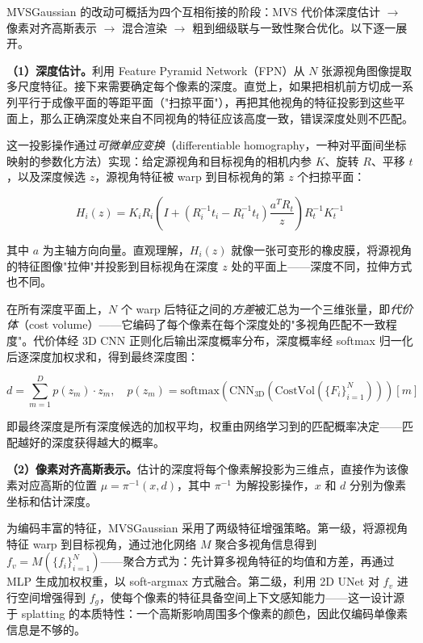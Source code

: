 MVSGaussian 的改动可概括为四个互相衔接的阶段：MVS 代价体深度估计 $\to$ 像素对齐高斯表示 $\to$ 混合渲染 $\to$ 粗到细级联与一致性聚合优化。以下逐一展开。

\textbf{（1）深度估计。}利用 Feature Pyramid Network（FPN）从 $N$ 张源视角图像提取多尺度特征。接下来需要确定每个像素的深度。直觉上，如果把相机前方切成一系列平行于成像平面的等距平面（"扫掠平面"），再把其他视角的特征投影到这些平面上，那么正确深度处来自不同视角的特征应该高度一致，错误深度处则不匹配。

这一投影操作通过\emph{可微单应变换}（differentiable homography，一种对平面间坐标映射的参数化方法）实现：给定源视角和目标视角的相机内参 $K$、旋转 $R$、平移 $t$，以及深度候选 $z$，源视角特征被 warp 到目标视角的第 $z$ 个扫掠平面：

\begin{equation}
H_i(z) = K_i R_i \left(I + (R_i^{-1} t_i - R_t^{-1} t_t) \frac{a^T R_t}{z}\right) R_t^{-1} K_t^{-1}
\end{equation}

其中 $a$ 为主轴方向向量。直观理解，$H_i(z)$ 就像一张可变形的橡皮膜，将源视角的特征图像"拉伸"并投影到目标视角在深度 $z$ 处的平面上——深度不同，拉伸方式也不同。

在所有深度平面上，$N$ 个 warp 后特征之间的\emph{方差}被汇总为一个三维张量，即\emph{代价体}（cost volume）——它编码了每个像素在每个深度处的"多视角匹配不一致程度"。代价体经 3D CNN 正则化后输出深度概率分布，深度概率经 softmax 归一化后逐深度加权求和，得到最终深度图：

\begin{equation}
d = \sum_{m=1}^{D} p(z_m) \cdot z_m, \quad p(z_m) = \text{softmax}(\text{CNN}_{\text{3D}}(\text{CostVol}(\{F_i\}_{i=1}^N)))[m]
\end{equation}

即最终深度是所有深度候选的加权平均，权重由网络学习到的匹配概率决定——匹配越好的深度获得越大的概率。

\textbf{（2）像素对齐高斯表示。}估计的深度将每个像素解投影为三维点，直接作为该像素对应高斯的位置 $\mu = \pi^{-1}(x, d)$，其中 $\pi^{-1}$ 为解投影操作，$x$ 和 $d$ 分别为像素坐标和估计深度。

为编码丰富的特征，MVSGaussian 采用了两级特征增强策略。第一级，将源视角特征 warp 到目标视角，通过池化网络 $M$ 聚合多视角信息得到 $f_v = M(\{f_i\}_{i=1}^N)$——聚合方式为：先计算多视角特征的均值和方差，再通过 MLP 生成加权权重，以 soft-argmax 方式融合。第二级，利用 2D UNet 对 $f_v$ 进行空间增强得到 $f_g$，使每个像素的特征具备空间上下文感知能力——这一设计源于 splatting 的本质特性：一个高斯影响周围多个像素的颜色，因此仅编码单像素信息是不够的。

